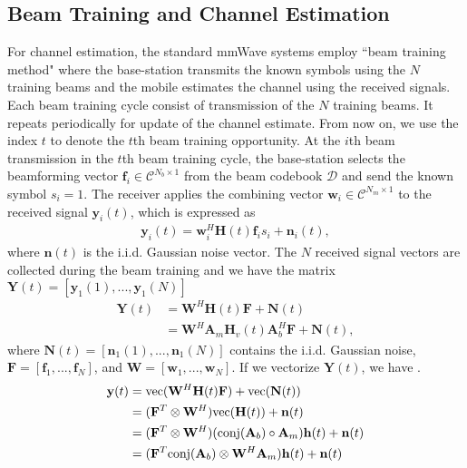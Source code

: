 \documentclass[conference]{IEEEtran}
\begin{document}
\subsection{Beam Training and Channel Estimation}

For channel estimation, the standard mmWave systems employ ``beam training method" where the base-station transmits the known symbols using the $N$ training beams and  the mobile estimates the channel
using the received signals. Each beam training cycle consist of transmission of the $N$ training beams. It repeats periodically for update of the channel estimate. From now on, we use the index $t$ to denote
the $t$th beam training opportunity.
At the $i$th beam transmission in the $t$th beam training cycle, the base-station selects the beamforming vector $\mathbf{f}_i \in \mathcal{C}^{N_b \times 1}$ from the beam codebook $\mathcal{D}$ and send the known symbol  $s_i=1$.
The receiver applies the combining vector $\mathbf{w}_i \in  \mathcal{C}^{N_m \times 1}$ to the received signal $\mathbf{y}_i(t)$, which is expressed as
\begin{align}
\mathbf{y}_i(t) = \mathbf{w}_i^{H} \mathbf{H}(t) \mathbf{f}_i s_i + \mathbf{n}_i(t),
\end{align}
where $\mathbf{n}(t)$ is the i.i.d. Gaussian noise vector.
The $N$ received signal vectors  are collected during the beam training and
we have the matrix $ \mathbf{Y}(t) = [\mathbf{y}_1(1), ...,\mathbf{y}_1(N) ]$ \cite{ref:static_chan_est}
\begin{align}
  \mathbf{Y}(t) & = \mathbf{W}^{H}\mathbf{H}(t)\mathbf{F}+\mathbf{N}(t) \nonumber \\
  & = \mathbf{W}^{H}\mathbf{A}_{m}\mathbf{H}_{v}(t)\mathbf{A}^{H}_{b} \mathbf{F}+\mathbf{N}(t), \label{eq:measurement}
\end{align}
where $\mathbf{N}(t) = [\mathbf{n}_1(1), ...,\mathbf{n}_1(N) ]$ contains the i.i.d. Gaussian noise, $\mathbf{F} = \left[\mathbf{f}_1, ..., \mathbf{f}_N \right]$, and
$\mathbf{W} = \left[\mathbf{w}_1, ..., \mathbf{w}_N \right]$.
If we vectorize $\mathbf{Y}(t)$,  we have \cite{ref:static_chan_est}.
\begin{align}
  \mathbf{y}(t) & = {\rm vec}(\mathbf{W}^{H}\mathbf{H}(t)\mathbf{F})+ {\rm vec}(\mathbf{N}(t)) \nonumber \\
  & = (\mathbf{F}^{T} \otimes \mathbf{W}^{H}){\rm vec}(\mathbf{H}(t))+\mathbf{n}(t) \nonumber \\
  & = (\mathbf{F}^{T} \otimes \mathbf{W}^{H})({\rm conj}(\mathbf{A}_{b})\circ \mathbf{A}_{m})\mathbf{h}(t)+\mathbf{n}(t) \nonumber \\
  & = (\mathbf{F}^{T}{\rm conj}(\mathbf{A}_{b})\otimes \mathbf{W}^{H}\mathbf{A}_{m})\mathbf{h}(t)+\mathbf{n}(t) \label{eq:ffff}
\end{align}
\end{document}

